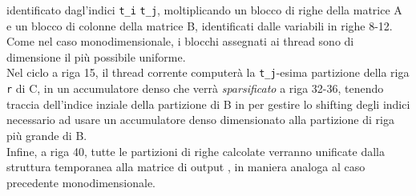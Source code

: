 identificato dagl'indici \verb|t_i| \verb|t_j|, 
moltiplicando un blocco di righe della matrice A e un blocco di colonne della matrice B,
identificati dalle variabili in righe 8-12.\\
Come nel caso monodimensionale, i blocchi assegnati ai thread sono di dimensione il più possibile uniforme.\\
Nel ciclo a riga 15, il thread corrente computerà la \verb|t_j|-esima partizione della riga \verb|r| di C, 
in un accumulatore denso che verrà \emph{sparsificato} a riga 32-36,
tenendo traccia dell'indice inziale della partizione di B in  per gestire lo 
shifting degli indici necessario ad usare un accumulatore denso dimensionato alla 
partizione di riga più grande di B.\\
Infine, a riga 40, tutte le partizioni di righe calcolate verranno unificate dalla struttura 
temporanea  alla matrice di output ,
in maniera analoga al caso precedente monodimensionale.\\

\clearpage
